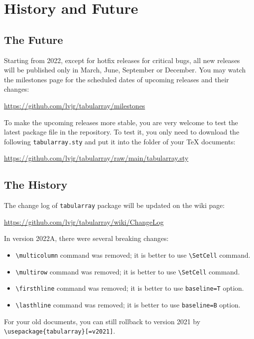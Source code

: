 \documentclass[oneside]{book}
\begin{document}
\chapter{History and Future}

\section{The Future}

Starting from 2022, except for hotfix releases for critical bugs,
all new releases will be published only in March, June, September or December.
You may watch the milestones page for the scheduled dates of upcoming releases
and their changes:

\begin{center}
\url{https://github.com/lvjr/tabularray/milestones}
\end{center}

To make the upcoming releases more stable, you are very welcome to test the latest package file
in the repository. To test it, you only need to download the following \verb!tabularray.sty!
and put it into the folder of your TeX documents:

\begin{center}
\url{https://github.com/lvjr/tabularray/raw/main/tabularray.sty}
\end{center}

\section{The History}

The change log of \verb!tabularray! package will be updated on the wiki page:

\begin{center}
\url{https://github.com/lvjr/tabularray/wiki/ChangeLog}
\end{center}

In version 2022A, there were several breaking changes:

\begin{itemize}
  \item \verb!\multicolumn! command was removed; it is better to use \verb!\SetCell! command.
  \item \verb!\multirow! command was removed; it is better to use \verb!\SetCell! command.
  \item \verb!\firsthline! command was removed; it is better to use \verb!baseline=T! option.
  \item \verb!\lasthline! command was removed; it is better to use \verb!baseline=B! option.
\end{itemize}

For your old documents, you can still rollback to version 2021 by \verb!\usepackage{tabularray}[=v2021]!.
\end{document}
